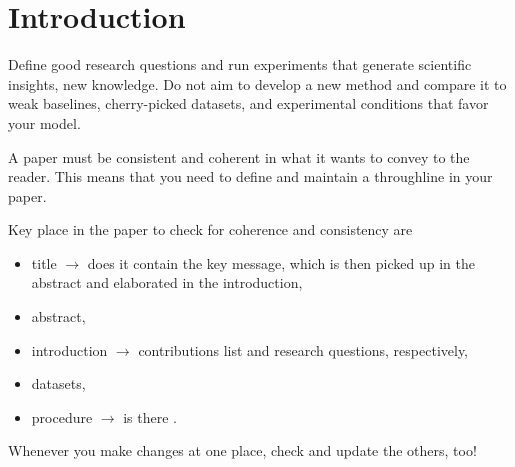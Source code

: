 \documentclass[sigconf, nonacm]{acmart}
\begin{document}



\maketitle

\section{Introduction}




\begin{tcolorbox}[title=What is Ego-less Research?,colback=red!20]
Define good research questions and run experiments that generate scientific insights, \ie new knowledge.
Do not aim to develop a new method and compare it to weak baselines, cherry-picked datasets, and experimental conditions that favor your model.
\end{tcolorbox}

\begin{tcolorbox}[title=Have a throughline in your paper and maintain it!,colback=red!20]
    A paper must be consistent and coherent in what it wants to convey to the reader.
    This means that you need to define and maintain a throughline in your paper.

    Key place in the paper to check for coherence and consistency are
    \begin{itemize}
        \item title $\rightarrow$ does it contain the key message, which is then picked up in the abstract and elaborated in the introduction, 
        \item abstract, 
        \item introduction $\rightarrow$ contributions list and research questions, respectively, 
        \item datasets,
        \item procedure $\rightarrow$ is there .
    \end{itemize}


    Whenever you make changes at one place, check and update the others, too!
\end{tcolorbox}
\end{document}
